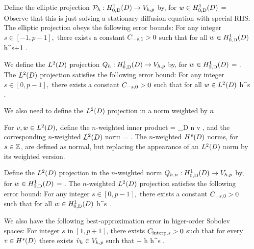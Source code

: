 Define the elliptic projection $\Ph:\HozDD\rightarrow\Vhp$ by, for $w \in \HozDD$
\beqs
{} =  \tforall \vh \in \Vhp
\eeqs
Observe that this is just solving a stationary diffusion equation with special RHS.
The elliptic projection obeys the following error bounds:
\label{lem:ellprojerr}
For any integer $s \in [-1,p-1],$ there exists a constant $C_{-s,1} >0$ such that for all $w \in \HozDD$
\beqs
{} \leq \Cmso h^{s+1} .
\eeqs
\ele{}

We define the $\LtD$ projection $\Qh:\HozDD\rightarrow \Vhp$ by, for $w \in \HozDD$
\beqs
{} =  \tforall \vh \in \Vhp.
\eeqs
The $\LtD$ projection satisfies the following error bound:
\label{lem:ltdprojerr}
For any integer $s \in [0,p-1],$ there exists a constant $C_{-s,0} >0$ such that for all $w \in \LtD$
\beqs
{} \leq \Cmso h^{s} .
\eeqs
\ele{}

We also need to define the $\LtD$ projection in a norm weighted by $n$

For $v,w \in \LtD,$ define the $n$-weighted inner product
\beqs
{} = \int_{D} n v \wbar,
\eeqs
and the corresponding $n$-weighted $\LtD$ norm
\beqs
{} = .
\eeqs
The $n$-weighted $\HsD$ norms, for $s \in \mathbb Z$, are defined as normal, but replacing the appearance of an $\LtD$ norm by its weighted version.

Define the $\LtD$ projection in the $n$-weighted norm $\Qhn:\HozDD\rightarrow \Vhp$ by, for $w \in \HozDD$
\beqs
{} =  \tforall \vh \in \Vhp.
\eeqs
The $n$-weighted $\LtD$ projection satisfies the following error bound:
\label{lem:wltdprojerr}
For any integer $s \in [0,p-1],$ there exists a constant $C_{-s,0} >0$ such that for all $w \in \HozDD$
\beqs
{} \leq \Cmso h^{s} .
\eeqs
\ele{}

We also have the following best-approximation error in higer-order Sobolev spaces:
\label{lem:bestapproxhigh}
For integer $s$ in $[1,p+1]$, there exists $C_{\mathrm{interp},s}>0$ such that for every $v \in \HsD$ there exists $\hat{v}_{h} \in V_{h,p}$ such that
\beqs
{} + h \leq \Cinterps h^s .
\eeqs
\ele



